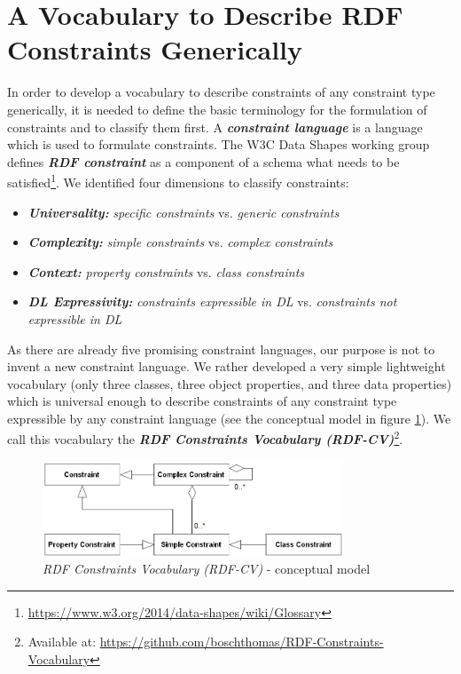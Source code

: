\documentclass{llncs}
\begin{document}
\section{A Vocabulary to Describe RDF Constraints Generically} 
\label{sec:vocabulary}

In order to develop a vocabulary to describe constraints of any constraint type generically, it is needed to define the basic terminology for the formulation of constraints and to classify them first. 
A \textbf{\emph{constraint language}} is a language which is used to formulate constraints.
The W3C Data Shapes working group defines \textbf{\emph{RDF constraint}} as a component of a schema what needs to be satisfied\footnote{\url{https://www.w3.org/2014/data-shapes/wiki/Glossary}}.
We identified four dimensions to classify constraints:
\begin{itemize}
  \item \textbf{\emph{Universality:}} \emph{specific constraints} vs. \emph{generic constraints}
	\item \textbf{\emph{Complexity:}} \emph{simple constraints} vs. \emph{complex constraints}
	\item \textbf{\emph{Context:}} \emph{property constraints} vs. \emph{class constraints}
	\item \textbf{\emph{DL Expressivity:}} \emph{constraints expressible in DL} vs. \emph{constraints not expressible in DL}
\end{itemize}

As there are already five promising constraint languages, our purpose is not to invent a new constraint language.
We rather developed a very simple lightweight vocabulary (only three classes, three object properties, and three data properties) which is universal enough to describe constraints of any constraint type expressible by any constraint language (see the conceptual model in figure \ref{fig:RDF-CV-conceptual-model}).
We call this vocabulary the \textbf{\emph{RDF Constraints Vocabulary (RDF-CV)}}\footnote{Available at: \url{https://github.com/boschthomas/RDF-Constraints-Vocabulary}}.

\begin{figure}
	\centering
		\includegraphics[width=0.80\textwidth]{images/RDF-CV-conceptual-model.png}
	\caption{\emph{RDF Constraints Vocabulary (RDF-CV)} - conceptual model}
	\label{fig:RDF-CV-conceptual-model}
\end{figure}
\end{document}
